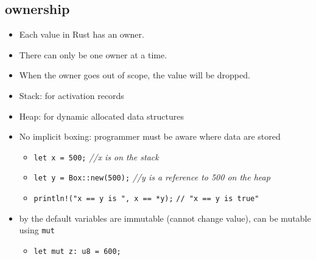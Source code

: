 \documentclass{article}
\begin{document}
\subsection{ownership}
\begin{itemize}
    \item Each value in Rust has an owner.
    \item There can only be one owner at a time.
    \item When the owner goes out of scope, the value will be dropped.
\end{itemize}
\begin{itemize}
    \item Stack: for activation records
    \item Heap: for dynamic allocated data structures
    \item No implicit boxing: programmer must be aware where data are stored 
    \begin{itemize}
        \item \texttt{let x = 500;} \textit{//x is on the stack}
        \item \texttt{let y = Box::new(500);} \textit{//y is a reference to 500 on the heap}
        \item \texttt{println!("x == y is {}", x == *y);} \texttt{// "x == y is true"}
    \end{itemize}
    \item by the default variables are immutable (cannot change value), can be mutable using \texttt{mut}
    \begin{itemize}
        \item \texttt{let mut z: u8 = 600;}
    \end{itemize}

\end{itemize}
\end{document}

